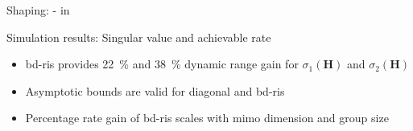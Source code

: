 \documentclass[presentation,xcolor={table},9pt]{beamer}
\begin{document}
\begin{section}{Shaping: - in }
	\begin{frame}{Simulation results: Singular value and achievable rate}
		\begin{figure}
			\centering \hspace*{-1cm}
		\end{figure}
		\vspace{1em}
		\begin{itemize}
			\item \gls{bd}-\gls{ris} provides \qty{22}{\percent} and \qty{38}{\percent} dynamic range gain for $\sigma_1(\mathbf{H})$ and $\sigma_2(\mathbf{H})$
			\item Asymptotic bounds are valid for diagonal and \gls{bd}-\gls{ris}
			\item Percentage rate gain of \gls{bd}-\gls{ris} scales with \gls{mimo} dimension and group size
		\end{itemize}
	\end{frame}
\end{section}



\end{document}
